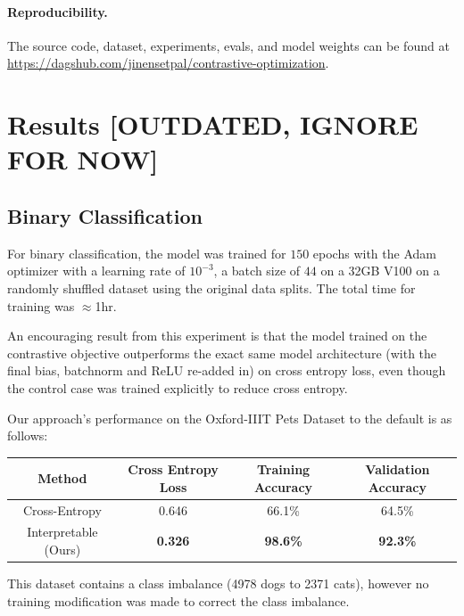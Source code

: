 \documentclass{article}
\begin{document}
\paragraph{Reproducibility.} The source code, dataset, experiments, evals, and model weights can be found at \url{https://dagshub.com/jinensetpal/contrastive-optimization}.

\section{Results [OUTDATED, IGNORE FOR NOW]}

\subsection{Binary Classification}

For binary classification, the model was trained for $150$ epochs with the Adam optimizer with a learning rate of $10^{-3}$, a batch size of $44$ on a 32GB V100 on a randomly shuffled dataset using the original data splits. The total time for training was $\approx$1hr.

An encouraging result from this experiment is that the model trained on the contrastive objective outperforms the exact same model architecture (with the final bias, batchnorm and ReLU re-added in) on cross entropy loss, even though the control case was trained explicitly to reduce cross entropy.

Our approach's performance on the Oxford-IIIT Pets Dataset to the default is as follows:

\begin{table}[h]
	\centering
	\begin{tabular}{c|ccc}
		\toprule
		\textbf{Method}  & \textbf{Cross Entropy Loss}  & \textbf{Training Accuracy}   & \textbf{Validation Accuracy} \\
		\midrule
		Cross-Entropy & 0.646 & 66.1\% & 64.5\% \\
		Interpretable (Ours) & \bf 0.326 & \bf 98.6\% & \bf 92.3\% \\
		\bottomrule
	\end{tabular}
\end{table}

This dataset contains a class imbalance (4978 dogs to 2371 cats), however no training modification was made to correct the class imbalance.
\end{document}

